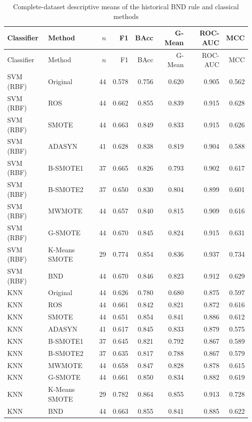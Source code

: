 \begingroup\scriptsize\setlength{\tabcolsep}{3pt}
\begin{longtable}{@{}llrrrrrr@{}}
\caption{Complete-dataset descriptive means of the historical BND rule and classical methods}\label{tab:4}\\
\toprule
Classifier & Method & $n$ & F1 & BAcc & G-Mean & ROC-AUC & MCC \\
\midrule
\endfirsthead
\toprule
Classifier & Method & $n$ & F1 & BAcc & G-Mean & ROC-AUC & MCC \\
\midrule
\endhead
\bottomrule
\endlastfoot
SVM (RBF) & Original & 44 & 0.578 & 0.756 & 0.620 & 0.905 & 0.562 \\
SVM (RBF) & ROS & 44 & 0.662 & 0.855 & 0.839 & 0.915 & 0.628 \\
SVM (RBF) & SMOTE & 44 & 0.663 & 0.849 & 0.833 & 0.915 & 0.626 \\
SVM (RBF) & ADASYN & 41 & 0.628 & 0.838 & 0.819 & 0.904 & 0.588 \\
SVM (RBF) & B-SMOTE1 & 37 & 0.665 & 0.826 & 0.793 & 0.902 & 0.617 \\
SVM (RBF) & B-SMOTE2 & 37 & 0.650 & 0.830 & 0.804 & 0.899 & 0.601 \\
SVM (RBF) & MWMOTE & 44 & 0.657 & 0.840 & 0.815 & 0.909 & 0.616 \\
SVM (RBF) & G-SMOTE & 44 & 0.670 & 0.845 & 0.824 & 0.915 & 0.631 \\
SVM (RBF) & K-Means SMOTE & 29 & 0.774 & 0.854 & 0.836 & 0.937 & 0.734 \\
SVM (RBF) & BND & 44 & 0.670 & 0.846 & 0.823 & 0.912 & 0.629 \\
KNN & Original & 44 & 0.626 & 0.780 & 0.680 & 0.875 & 0.597 \\
KNN & ROS & 44 & 0.661 & 0.842 & 0.821 & 0.872 & 0.616 \\
KNN & SMOTE & 44 & 0.651 & 0.854 & 0.841 & 0.886 & 0.612 \\
KNN & ADASYN & 41 & 0.617 & 0.845 & 0.833 & 0.879 & 0.575 \\
KNN & B-SMOTE1 & 37 & 0.645 & 0.821 & 0.792 & 0.867 & 0.589 \\
KNN & B-SMOTE2 & 37 & 0.635 & 0.817 & 0.788 & 0.867 & 0.579 \\
KNN & MWMOTE & 44 & 0.658 & 0.847 & 0.828 & 0.878 & 0.615 \\
KNN & G-SMOTE & 44 & 0.661 & 0.850 & 0.834 & 0.882 & 0.619 \\
KNN & K-Means SMOTE & 29 & 0.782 & 0.864 & 0.855 & 0.913 & 0.728 \\
KNN & BND & 44 & 0.663 & 0.855 & 0.841 & 0.885 & 0.622 \\

\end{longtable}

